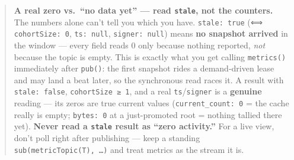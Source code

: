 \documentclass[
  nobib]{tufte-handout}
\newenvironment{Shaded}{}{}
\newcommand{\AttributeTok}[1]{\textcolor[rgb]{0.49,0.56,0.16}{#1}}
\newcommand{\BuiltInTok}[1]{\textcolor[rgb]{0.00,0.50,0.00}{#1}}
\newcommand{\ControlFlowTok}[1]{\textcolor[rgb]{0.00,0.44,0.13}{\textbf{#1}}}
\newcommand{\DataTypeTok}[1]{\textcolor[rgb]{0.56,0.13,0.00}{#1}}
\newcommand{\FunctionTok}[1]{\textcolor[rgb]{0.02,0.16,0.49}{#1}}
\newcommand{\KeywordTok}[1]{\textcolor[rgb]{0.00,0.44,0.13}{\textbf{#1}}}
\newcommand{\NormalTok}[1]{#1}
\newcommand{\OperatorTok}[1]{\textcolor[rgb]{0.40,0.40,0.40}{#1}}
\newcommand{\SpecialCharTok}[1]{\textcolor[rgb]{0.25,0.44,0.63}{#1}}
\newcommand{\StringTok}[1]{\textcolor[rgb]{0.25,0.44,0.63}{#1}}
\newcommand{\VerbatimStringTok}[1]{\textcolor[rgb]{0.25,0.44,0.63}{#1}}
\begin{document}
\begin{quote}
\textbf{A real zero vs.\ ``no data yet'' --- read \texttt{stale}, not the
counters.} The numbers alone can't tell you which you have.
\texttt{stale:\ true} (⟺ \texttt{cohortSize:\ 0}, \texttt{ts:\ null},
\texttt{signer:\ null}) means \textbf{no snapshot arrived} in the window --- every
field reads 0 only because nothing reported, \emph{not} because the topic is empty.
This is exactly what you get calling \texttt{metrics()} immediately after
\texttt{pub()}: the first snapshot rides a demand-driven lease and may land a beat
later, so the synchronous read races it. A result with \texttt{stale:\ false},
\texttt{cohortSize\ ≥\ 1}, and a real \texttt{ts}/\texttt{signer} is a
\textbf{genuine} reading --- its zeros are true current values
(\texttt{current\_count:\ 0} = the cache really is empty; \texttt{bytes:\ 0} at a
just-promoted root = nothing tallied there yet). \textbf{Never read a
\texttt{stale} result as ``zero activity.''} For a live view, don't poll right
after publishing --- keep a standing \texttt{sub(metricTopic(T),\ …)} and treat
metrics as the stream it is.
\end{quote}

\begin{Shaded}
\end{Shaded}
\end{document}
